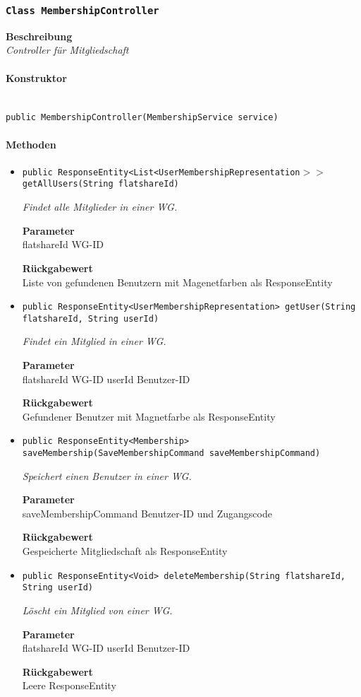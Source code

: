     \subsubsection{\texttt{Class MembershipController}}
    \textbf{Beschreibung} \\
    \textit{Controller für Mitgliedschaft}
    \paragraph*{Konstruktor}\mbox{} \\
    \texttt{public MembershipController(MembershipService service)} \\
    \paragraph*{Methoden}
    \begin{itemize}
    	\item{\texttt{public ResponseEntity<List<UserMembershipRepresentation$>>$ getAllUsers(String flatshareId)}}
    	
    	\textit{Findet alle Mitglieder in einer WG.}
    	
    	\textbf{Parameter} \\
    	flatshareId WG-ID
    	
    	\textbf{Rückgabewert} \\
    	Liste von gefundenen Benutzern mit Magenetfarben als ResponseEntity        \item{\texttt{public ResponseEntity<UserMembershipRepresentation> getUser(String flatshareId, String userId)}}
    	
    	\textit{Findet ein Mitglied in einer WG.}
    	
    	\textbf{Parameter} \\
    	flatshareId WG-ID
    	userId Benutzer-ID
    	
    	\textbf{Rückgabewert} \\
    	Gefundener Benutzer mit Magnetfarbe als ResponseEntity        \item{\texttt{public ResponseEntity<Membership> saveMembership(SaveMembershipCommand saveMembershipCommand)}}
    	
    	\textit{Speichert einen Benutzer in einer WG.}
    	
    	\textbf{Parameter} \\
    	saveMembershipCommand Benutzer-ID und Zugangscode
    	
    	\textbf{Rückgabewert} \\
    	Gespeicherte Mitgliedschaft als ResponseEntity        \item{\texttt{public ResponseEntity<Void> deleteMembership(String flatshareId, String userId)}}
    	
    	\textit{Löscht ein Mitglied von einer WG.}
    	
    	\textbf{Parameter} \\
    	flatshareId WG-ID
    	userId Benutzer-ID
    	
    	\textbf{Rückgabewert} \\
    	Leere ResponseEntity
    \end{itemize}
